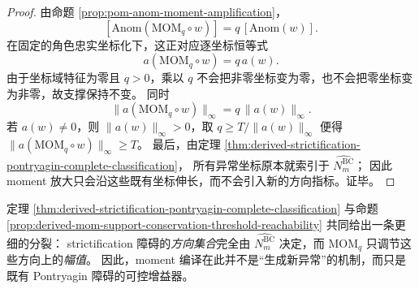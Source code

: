 \begin{proof}
由命题 \ref{prop:pom-anom-moment-amplification}，
\[
[\mathrm{Anom}(\mathrm{MOM}_q\circ w)]
=
q\,[\mathrm{Anom}(w)].
\]
在固定的角色忠实坐标化下，这正对应逐坐标恒等式
\[
a(\mathrm{MOM}_q\circ w)=q\,a(w).
\]
由于坐标域特征为零且 \(q>0\)，乘以 \(q\) 不会把非零坐标变为零，也不会把零坐标变为非零，故支撑保持不变。
同时
\[
\|a(\mathrm{MOM}_q\circ w)\|_\infty
=
q\,\|a(w)\|_\infty.
\]
若 \(a(w)\neq 0\)，则 \(\|a(w)\|_\infty>0\)，取
\(
q\ge T/\|a(w)\|_\infty
\)
便得
\(
\|a(\mathrm{MOM}_q\circ w)\|_\infty\ge T
\)。
最后，由定理 \ref{thm:derived-strictification-pontryagin-complete-classification}，
所有异常坐标原本就索引于
\(
\widehat{N_m^{\mathrm{BC}}}
\)；
因此 moment 放大只会沿这些既有坐标伸长，而不会引入新的方向指标。证毕。
\end{proof}

\begin{remark}\label{rem:derived-strictification-pontryagin-direction-amplitude-splitting}
定理 \ref{thm:derived-strictification-pontryagin-complete-classification}
与命题
\ref{prop:derived-mom-support-conservation-threshold-reachability}
共同给出一条更细的分裂：
strictification 障碍的\emph{方向集合}完全由
\(
\widehat{N_m^{\mathrm{BC}}}
\)
决定，而 \(\mathrm{MOM}_q\) 只调节这些方向上的\emph{幅值}。
因此，moment 编译在此并不是“生成新异常”的机制，而只是既有 Pontryagin 障碍的可控增益器。
\end{remark}

\endinput
